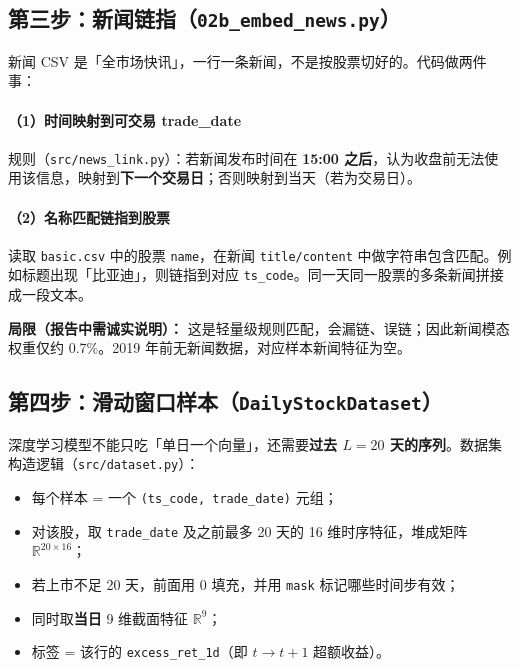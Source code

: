 \documentclass[UTF8,a4paper,12pt]{ctexart}
\begin{document}
\subsection{第三步：新闻链指（\texttt{02b\_embed\_news.py}）}

新闻 CSV 是「全市场快讯」，一行一条新闻，不是按股票切好的。代码做两件事：

\paragraph{（1）时间映射到可交易 trade\_date}

规则（\texttt{src/news\_link.py}）：若新闻发布时间在 \textbf{15:00 之后}，认为收盘前无法使用该信息，映射到\textbf{下一个交易日}；否则映射到当天（若为交易日）。

\paragraph{（2）名称匹配链指到股票}

读取 \texttt{basic.csv} 中的股票 \texttt{name}，在新闻 \texttt{title/content} 中做字符串包含匹配。例如标题出现「比亚迪」，则链指到对应 \texttt{ts\_code}。同一天同一股票的多条新闻拼接成一段文本。

\textbf{局限（报告中需诚实说明）：} 这是轻量级规则匹配，会漏链、误链；因此新闻模态权重仅约 0.7\%。2019 年前无新闻数据，对应样本新闻特征为空。

\subsection{第四步：滑动窗口样本（\texttt{DailyStockDataset}）}

深度学习模型不能只吃「单日一个向量」，还需要\textbf{过去 $L=20$ 天的序列}。数据集构造逻辑（\texttt{src/dataset.py}）：

\begin{itemize}[leftmargin=2em]
  \item 每个样本 = 一个 \texttt{(ts\_code, trade\_date)} 元组；
  \item 对该股，取 \texttt{trade\_date} 及之前最多 20 天的 16 维时序特征，堆成矩阵 $\mathbb{R}^{20\times 16}$；
  \item 若上市不足 20 天，前面用 0 填充，并用 \texttt{mask} 标记哪些时间步有效；
  \item 同时取\textbf{当日} 9 维截面特征 $\mathbb{R}^{9}$；
  \item 标签 = 该行的 \texttt{excess\_ret\_1d}（即 $t\!\to\! t\!+\!1$ 超额收益）。
\end{itemize}
\end{document}
